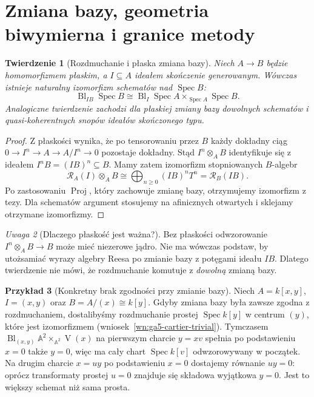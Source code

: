 \documentclass[11pt,a4paper,openany]{report}
\numberwithin{equation}{section}
\theoremstyle{plain}
\newtheorem{twierdzenie}{Twierdzenie}[section]
\theoremstyle{definition}
\newtheorem{przyklad}[twierdzenie]{Przykład}
\theoremstyle{remark}
\newtheorem{uwaga}[twierdzenie]{Uwaga}
\newcommand{\A}{\mathbb A}
\newcommand{\V}{\operatorname V}
\newcommand{\Spec}{\operatorname{Spec}}
\begin{document}
\section{Zmiana bazy, geometria biwymierna i granice metody}
\label{sec:ga5-basechange}

\begin{twierdzenie}[Rozdmuchanie i płaska zmiana bazy]
\label{tw:ga5-flat-basechange}
Niech $A\to B$ będzie homomorfizmem płaskim,
a $I\subseteq A$ ideałem skończenie generowanym.
Wówczas istnieje naturalny izomorfizm schematów nad
$\Spec B$:
\[
 \operatorname{Bl}_{IB}\Spec B\cong
 \operatorname{Bl}_{I}\Spec A\times_{\Spec A}\Spec B.
\]
Analogiczne twierdzenie zachodzi dla płaskiej zmiany
bazy dowolnych schematów i quasi-koherentnych
snopów ideałów skończonego typu.
\end{twierdzenie}
\begin{proof}
Z płaskości wynika, że po tensorowaniu przez $B$
każdy dokładny ciąg
$0\to I^n\to A\to A/I^n\to0$ pozostaje dokładny.
Stąd $I^n\otimes_A B$ identyfikuje się z ideałem
$I^nB=(IB)^n\subseteq B$. Mamy zatem izomorfizm
stopniowanych $B$-algebr
\[
 \mathcal R_A(I)\otimes_A B\cong
 \bigoplus_{n\ge0}(IB)^nT^n=\mathcal R_B(IB).
\]
Po zastosowaniu $\operatorname{Proj}$, który zachowuje
zmianę bazy, otrzymujemy izomorfizm z tezy.
Dla schematów argument stosujemy na afinicznych
otwartych i sklejamy otrzymane izomorfizmy.
\end{proof}

\begin{uwaga}[Dlaczego płaskość jest ważna?]
Bez płaskości odwzorowanie $I^n\otimes_A B\to B$
może mieć niezerowe jądro. Nie ma wówczas podstaw,
by utożsamiać wyrazy algebry Reesa po zmianie bazy
z potęgami ideału $IB$. Dlatego twierdzenie nie mówi,
że rozdmuchanie komutuje z \emph{dowolną} zmianą bazy.
\end{uwaga}

\begin{przyklad}[Konkretny brak zgodności przy zmianie bazy]
Niech $A=k[x,y]$, $I=(x,y)$ oraz
$B=A/(x)\cong k[y]$. Gdyby zmiana bazy była zawsze
zgodna z rozdmuchaniem, dostalibyśmy rozdmuchanie
prostej $\Spec k[y]$ w centrum $(y)$, które jest
izomorfizmem (wniosek~\ref{wn:ga5-cartier-trivial}).
Tymczasem
$\operatorname{Bl}_{(x,y)}\A^2\times_{\A^2}\V(x)$
na pierwszym charcie $y=xv$ spełnia po podstawieniu
$x=0$ także $y=0$, więc ma cały chart
$\Spec k[v]$ odwzorowywany w początek.
Na drugim charcie $x=uy$ po podstawieniu $x=0$
dostajemy równanie $uy=0$: oprócz transformaty
prostej $u=0$ znajduje się składowa wyjątkowa
$y=0$. Jest to większy schemat niż sama prosta.
\end{przyklad}
\end{document}
